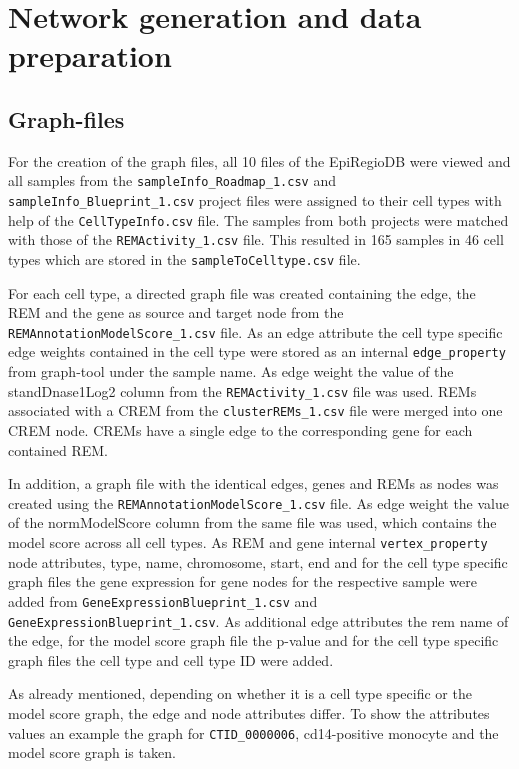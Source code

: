 \documentclass[pdftex,12pt,a4paper]{report}
\begin{document}
\section{Network generation and data preparation}
\subsection{Graph-files}
\label{graphfiles}
For the creation of the graph files, all 10 files of the EpiRegioDB were viewed and all samples from the \texttt{sampleInfo\_Roadmap\_1.csv} and \texttt{sampleInfo\_Blueprint\_1.csv} project files were assigned to their cell types with help of the \texttt{CellTypeInfo.csv} file. The samples from both projects were matched with those of the \texttt{REMActivity\_1.csv} file. This resulted in 165 samples in 46 cell types which are stored in the \texttt{sampleToCelltype.csv} file. 

For each cell type, a directed graph file was created containing the edge, the REM and the gene as source and target node from the \texttt{REMAnnotationModelScore\_1.csv} file. As an edge attribute the cell type specific edge weights contained in the cell type were stored as an internal \texttt{edge\_property} from graph-tool under the sample name. As edge weight the value of the standDnase1Log2 column from the \texttt{REMActivity\_1.csv} file was used. REMs associated with a CREM from the \texttt{clusterREMs\_1.csv} file were merged into one CREM node. CREMs have a single edge to the corresponding gene for each contained REM. 

In addition, a graph file with the identical edges, genes and REMs as nodes was created using the \texttt{REMAnnotationModelScore\_1.csv} file. As edge weight the value of the normModelScore column from the same file was used, which contains the model score across all cell types.
As REM and gene internal \texttt{vertex\_property} node attributes, type, name, chromosome, start, end and for the cell type specific graph files the gene expression for gene nodes for the respective sample were added from \texttt{GeneExpressionBlueprint\_1.csv} and \texttt{GeneExpressionBlueprint\_1.csv}.
As additional edge attributes the rem name of the edge, for the model score graph file the p-value and for the cell type specific graph files the cell type and cell type ID were added. 

As already mentioned, depending on whether it is a cell type specific or the model score graph, the edge and node attributes differ. To show the attributes values an example the graph for \texttt{CTID\_0000006}, cd14-positive monocyte and the model score graph is taken. 
\end{document}
